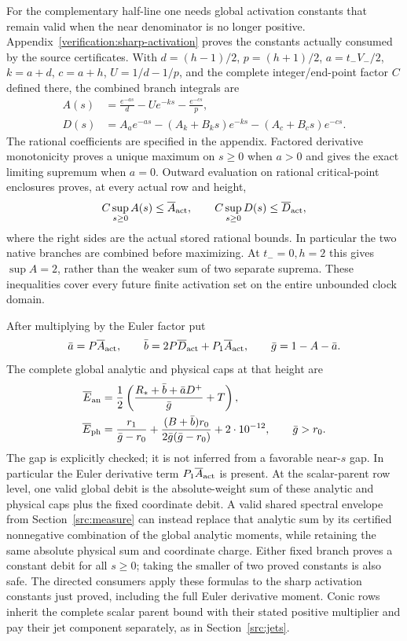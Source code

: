 \documentclass[11pt,a4paper]{article}
\theoremstyle{definition}
\theoremstyle{remark}
\begin{document}
For the complementary half-line one needs global activation constants
that remain valid when the near denominator is no longer positive.
Appendix~\ref{verification:sharp-activation} proves the constants actually
consumed by the source certificates. With $d=(h-1)/2$, $p=(h+1)/2$,
$a=t_-V_-/2$, $k=a+d$, $c=a+h$, $U=1/d-1/p$, and the complete
integer/end-point factor $C$ defined there, the combined branch integrals are
\begin{align}
 A(s)&=\frac{e^{-as}}d-Ue^{-ks}-\frac{e^{-cs}}p,
     \label{src:activation-global-value}\\
 D(s)&=A_a e^{-as}-(A_k+B_ks)e^{-ks}-(A_c+B_cs)e^{-cs}.
     \label{src:activation-global-derivative}
\end{align}
The rational coefficients are specified in the appendix. Factored
derivative monotonicity proves a unique maximum on $s\geq0$ when
$a>0$ and gives the exact limiting supremum when $a=0$.
Outward evaluation on rational critical-point enclosures proves, at every
actual row and height,
\[
 C\sup_{s\geq0}A(s)\leq\overline A_{\rm act},\qquad
 C\sup_{s\geq0}D(s)\leq\overline D_{\rm act},
\]
where the right sides are the actual stored rational bounds.
In particular the two native branches are combined before maximizing.
At $t_-=0,h=2$ this gives $\sup A=2$, rather than the weaker
sum of two separate suprema. These inequalities cover every future
finite activation set on the entire unbounded clock domain.

After multiplying by the Euler factor put
\[
 \bar a=P\overline A_{\rm act},\qquad
 \bar b=2P\overline D_{\rm act}+P_1\overline A_{\rm act},\qquad
 \bar g=1-A-\bar a.
\]
The complete global analytic and physical caps at that height are
\begin{align}
 \overline E_{\rm an}
  &=\frac12\left(\frac{R_*+\bar b+\bar aD^+}{\bar g}+T\right),
      \label{src:global-analytic-cap}\\
 \overline E_{\rm ph}
  &=\frac{r_1}{\bar g-r_0}
   +\frac{(B+\bar b)r_0}{2\bar g(\bar g-r_0)}
   +2\cdot10^{-12},\qquad \bar g>r_0.
      \label{src:global-physical-cap}
\end{align}
The gap is explicitly checked; it is not inferred from a favorable
near-$s$ gap.  In particular the Euler derivative term
$P_1\overline A_{\rm act}$ is present.  At the scalar-parent row level,
one valid global debit is the absolute-weight sum of these analytic
and physical caps plus the fixed coordinate debit.  A valid shared
spectral envelope from Section~\ref{src:measure} can instead replace
that analytic sum by its certified nonnegative combination of the
global analytic moments, while retaining the same absolute physical
sum and coordinate charge.  Either fixed branch proves a constant
debit for all $s\geq0$; taking the smaller of two proved constants is
also safe. The directed consumers apply these formulas to the sharp
activation constants just proved, including the full Euler derivative
moment. Conic rows inherit the complete scalar
parent bound with their stated positive multiplier and pay their jet
component separately, as in Section~\ref{src:jets}.
\end{document}
